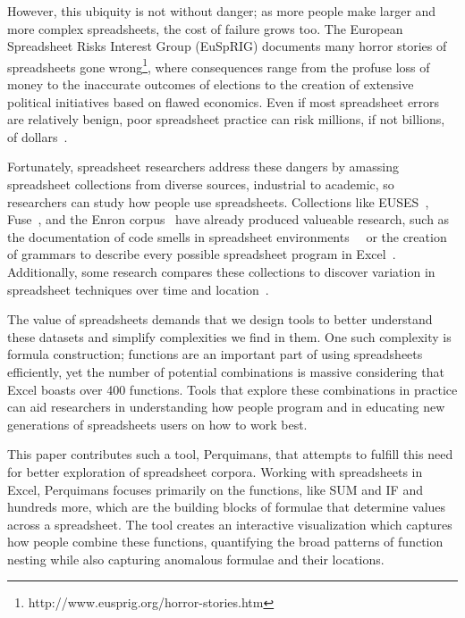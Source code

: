 \documentclass[conference]{IEEEtran}
\newcommand{\toolname}{Perquimans\xspace} \newcommand{\toolnameend}{Perquimans}
\begin{document}
	However, this ubiquity is not without danger; as more people make larger and
	more complex spreadsheets, the cost of failure grows too. The European
	Spreadsheet Risks Interest Group (EuSpRIG) documents many horror stories of
	spreadsheets gone wrong\footnote{http://www.eusprig.org/horror-stories.htm},
	where consequences range from the profuse loss of money to the inaccurate
	outcomes of elections to the creation of extensive political initiatives based
	on flawed economics. Even if most spreadsheet errors are relatively benign,
	poor spreadsheet practice can risk millions, if not billions, of
	dollars~\cite{powell2009impact}.
	
	Fortunately, spreadsheet researchers address these dangers by amassing
	spreadsheet collections from diverse sources, industrial to academic, so
	researchers can study how people use spreadsheets. Collections like
	EUSES~\cite{fisher2005euses}, Fuse~\cite{barik2015fuse}, and the Enron
	corpus~\cite{hermans2015enron} have already produced valueable research, such
	as the documentation of code smells in spreadsheet
	environments~\cite{hermans2012detecting}~\cite{jansen2015code} or the creation
	of grammars to describe every possible spreadsheet program in
	Excel~\cite{aivaloglou2015grammar}. Additionally, some research compares these
	collections to discover variation in spreadsheet techniques over time and
	location~\cite{jansen2015enron}.
	
	The value of spreadsheets demands that we design tools to better understand
	these datasets and simplify complexities we find in them. One such complexity
	is formula construction; functions are an important part of using spreadsheets
	efficiently, yet the number of potential combinations is massive considering
	that Excel boasts over 400 functions. Tools that explore these combinations in
	practice can aid researchers in understanding how people program and in
	educating new generations of spreadsheets users on how to work best.
	
	This paper contributes such a tool, \toolnameend, that attempts to fulfill this
	need for better exploration of spreadsheet corpora. Working with spreadsheets
	in Excel, \toolname focuses primarily on the functions, like SUM and IF and
	hundreds more, which are the building blocks of formulae that determine values
	across a spreadsheet. The tool creates an interactive visualization which
	captures how people combine these functions, quantifying the broad patterns of
	function nesting while also capturing anomalous formulae and their locations.
	
\end{document}
